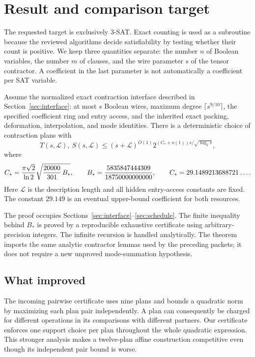 \section{Result and comparison target}

The requested target is exclusively 3-SAT. Exact counting is used as a
subroutine because the reviewed algorithms decide satisfiability by testing
whether their count is positive. We keep three quantities separate:
the number \(n\) of Boolean variables, the number \(m\) of clauses, and
the wire parameter \(s\) of the tensor contractor. A coefficient in the
last parameter is not automatically a coefficient per SAT variable.

\begin{theorem}\label{thm:main}
Assume the normalized exact contraction interface described in
Section~\ref{sec:interface}: at most \(s\) Boolean wires, maximum degree
\(\lceil s^{9/10}\rceil\), the specified coefficient ring and entry access,
and the inherited exact packing, deformation, interpolation, and mode
identities. There is a deterministic choice of contraction plans with
\[
 T(s,\mathcal L),\ S(s,\mathcal L)
 \le (s+\mathcal L)^{O(1)}
       2^{(C_*+o(1))s/\sqrt{\log_2 s}},
\]
where
\begin{equation}\label{eq:mainconstant}
 C_*=\frac{\pi\sqrt2}{\ln2}
          \sqrt{\frac{20000}{301}\,B_*},
 \qquad
 B_*=\frac{5835847444309}{18750000000000},
 \qquad C_*=29.1489213688721\ldots.
\end{equation}
Here \(\mathcal L\) is the description length and all hidden entry-access
constants are fixed. The constant \(29.149\) is an eventual upper-bound
coefficient for both resources.
\end{theorem}

The proof occupies Sections~\ref{sec:interface}--\ref{sec:schedule}.
The finite inequality behind \(B_*\) is proved by a reproducible exhaustive
certificate using arbitrary-precision integers. The infinite recursion is
handled analytically. The theorem imports the same analytic contractor
lemmas used by the preceding packets; it does not require a new unproved
mode-summation hypothesis.

\subsection{What improved}

The incoming pairwise certificate uses nine plans and bounds a quadratic
norm by maximizing each plan pair independently. A plan can consequently
be charged for different operations in its comparisons with different
partners. Our certificate enforces one support choice per plan throughout
the whole quadratic expression. This stronger analysis makes a twelve-plan
affine construction competitive even though its independent pair bound
is worse.

